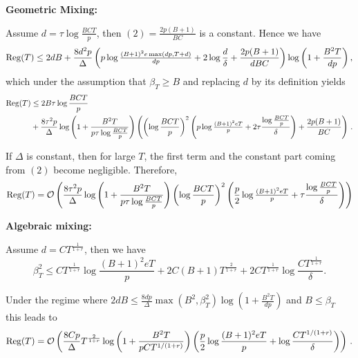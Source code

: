 \textbf{Geometric Mixing:}

Assume $d= \tau \log \frac{BCT}{p}$, then $(2)=\frac{2p(B+1)}{BC}$ is a constant.  Hence we have \[ \mathrm{Reg}(T)\leq 2dB + \frac{8d^2p}{\Delta}\left(p\log\tfrac{(B+1)^2e\max(dp,T+d)}{dp}+2\log \frac{d}{\delta}+ \frac{2p(B+1)}{dBC} \right)\log\left(1 + \frac{B^2T}{dp}\right), \]
which under the assumption that $\beta_T \geq B$ and replacing $d$ by its definition yields
\begin{align*}
\mathrm{Reg}(T) &\leq 2B\tau \log \frac{BCT}{p}\\
&+ \frac{8\tau^2p}{\Delta}\log\left(1 + \frac{B^2T}{p\tau \log \frac{BCT}{p}}\right)\left(\left(\log\frac{BCT}{p}\right)^2 \left(p\log\tfrac{(B+1)^2eT}{p}+2\tau\frac{\log \frac{BCT}{p}}{\delta}\right)+\frac{2p(B+1)}{BC}\right)\,.
\end{align*}

If $\Delta$ is constant, then for large $T$, the first term and the constant part coming from $(2)$ become negligible. Therefore,
\[\mathrm{Reg}(T) = \mathcal{O}\left(\frac{8\tau^2p}{\Delta}\log\left(1 + \frac{B^2T}{p\tau \log \frac{BCT}{p}}\right)\left(\log\frac{BCT}{p}\right)^2 \left(\frac{p}{2}\log\tfrac{(B+1)^2eT}{p}+\tau\frac{\log \frac{BCT}{p}}{\delta}\right)\right)\]

\textbf{Algebraic mixing:}

Assume $d =  CT^{\frac{1}{1+r}}$, then we have
\[\beta_T^2 \leq CT^{\frac{1}{1+r}}\log \frac{(B+1)^2eT}{p} + 2C(B+1)T^{\frac{2}{1+r}} + 2C T^{\frac{1}{1+r}}\log\frac{C T^{\frac{1}{1+r}}}{\delta}.\]

Under the regime where $2dB \le \frac{8dp}{\Delta}\max(B^2, \beta_{T}^2)\log\left(1 + \frac{B^2T}{dp}\right)$ and $B\le \beta_T$ this leads to 
\[\mathrm{Reg}(T) =\mathcal{O}\left( \frac{8Cp}{\Delta}T^{\frac{2}{1+r}}\log\left(1 + \frac{B^2T}{pCT^{1/(1+r)}}\right)\left(\frac{p}{2}\log\frac{(B+1)^2eT}{p}+\log \frac{CT^{1/(1+r)}}{\delta}\right)\right)\,.\]
